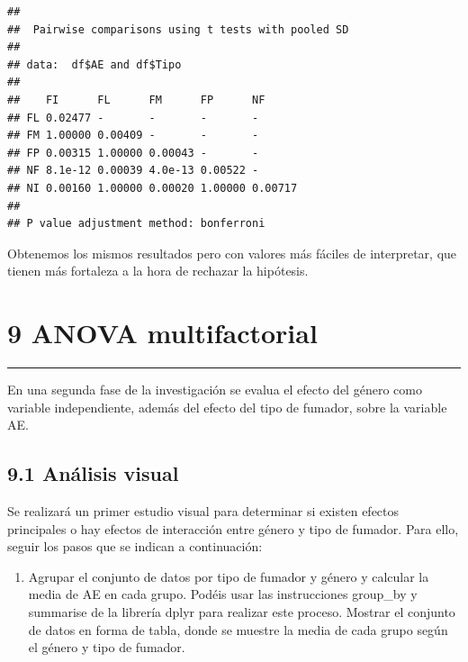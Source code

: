 \documentclass[
]{article}
\providecommand{\tightlist}{%
  \setlength{\itemsep}{0pt}\setlength{\parskip}{0pt}}
\begin{document}
\begin{verbatim}
## 
##  Pairwise comparisons using t tests with pooled SD 
## 
## data:  df$AE and df$Tipo 
## 
##    FI      FL      FM      FP      NF     
## FL 0.02477 -       -       -       -      
## FM 1.00000 0.00409 -       -       -      
## FP 0.00315 1.00000 0.00043 -       -      
## NF 8.1e-12 0.00039 4.0e-13 0.00522 -      
## NI 0.00160 1.00000 0.00020 1.00000 0.00717
## 
## P value adjustment method: bonferroni
\end{verbatim}

\vspace{0.3cm}

Obtenemos los mismos resultados pero con valores más fáciles de
interpretar, que tienen más fortaleza a la hora de rechazar la
hipótesis.

\newpage

\hypertarget{anova-multifactorial}{%
\section{9 ANOVA multifactorial}\label{anova-multifactorial}}

\begin{center}\rule{0.5\linewidth}{0.5pt}\end{center}

\vspace{0.3cm}

En una segunda fase de la investigación se evalua el efecto del género
como variable independiente, además del efecto del tipo de fumador,
sobre la variable AE.

\vspace{0.3cm}

\hypertarget{anuxe1lisis-visual}{%
\subsection{9.1 Análisis visual}\label{anuxe1lisis-visual}}

\vspace{0.3cm}

Se realizará un primer estudio visual para determinar si existen efectos
principales o hay efectos de interacción entre género y tipo de fumador.
Para ello, seguir los pasos que se indican a continuación:

\vspace{0.3cm}

\begin{enumerate}
\def\labelenumi{\arabic{enumi}.}
\tightlist
\item
  Agrupar el conjunto de datos por tipo de fumador y género y calcular
  la media de AE en cada grupo. Podéis usar las instrucciones group\_by
  y summarise de la librería dplyr para realizar este proceso. Mostrar
  el conjunto de datos en forma de tabla, donde se muestre la media de
  cada grupo según el género y tipo de fumador.
\end{enumerate}
\end{document}
